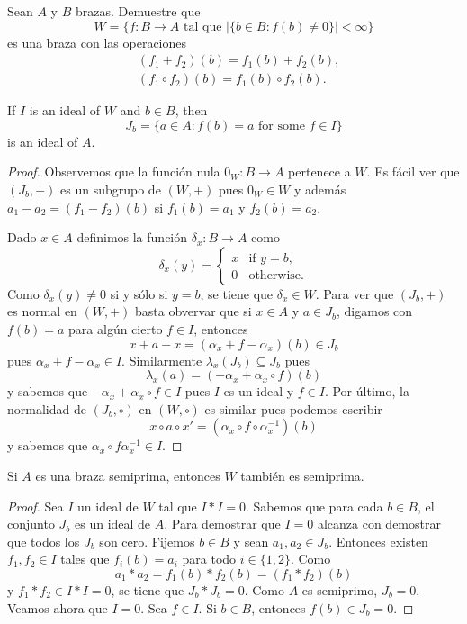 \begin{lemma}
    Sean $A$ y $B$ brazas. Demuestre que
    \[
    W=\{f\colon B\to A\text{ tal que $|\{b\in B:f(b)\ne 0\}|<\infty$}\}
    \]
    es una braza con las operaciones
    \begin{align*}
        &(f_1+f_2)(b)=f_1(b)+f_2(b),
        \\
        &(f_1\circ f_2)(b)=f_1(b)\circ f_2(b).
    \end{align*}
\end{lemma}

\begin{lemma}
    If $I$ is an ideal of $W$ and $b\in B$, then
    \[
    J_b=\{a\in A:f(b)=a\text{ for some $f\in I$}\}
    \]
    is an ideal of $A$.
\end{lemma}

\begin{proof}
    Observemos que la función nula $0_W\colon B\to A$ pertenece a $W$. Es fácil
    ver que $(J_b,+)$ es un subgrupo de $(W,+)$ pues $0_W\in W$ y además
    $a_1-a_2=(f_1-f_2)(b)$ si $f_1(b)=a_1$ y $f_2(b)=a_2$. 
    
    Dado $x\in A$ definimos la función $\delta_x\colon B\to A$ como
    \[
    \delta_x(y)=\begin{cases}
    x & \text{if $y=b$},\\
    0 & \text{otherwise}.
    \end{cases}
    \]
    Como $\delta_x(y)\ne 0$ si y sólo si $y=b$, se tiene que $\delta_x\in W$. Para ver
    que $(J_b,+)$ es normal en $(W,+)$ basta obvervar que si $x\in A$ y $a\in J_b$, digamos
    con $f(b)=a$ para algún cierto $f\in I$, entonces 
    \[
    x+a-x=(\alpha_x+f-\alpha_x)(b)\in J_b
    \]
    pues $\alpha_x+f-\alpha_x\in I$. Similarmente $\lambda_x(J_b)\subseteq J_b$ pues
    \[
    \lambda_x(a)=(-\alpha_x+\alpha_x\circ f)(b)
    \]
    y sabemos que $-\alpha_x+\alpha_x\circ f\in I$ pues $I$ es un ideal y $f\in I$. Por último,
    la normalidad de $(J_b,\circ)$ en $(W,\circ)$ es similar pues podemos escribir
    \[
    x\circ a\circ x'=(\alpha_x\circ f\circ\alpha_x^{-1})(b)
    \]
    y sabemos que $\alpha_x\circ f\alpha_x^{-1}\in I$.
\end{proof}

\begin{proposition}
Si $A$ es una braza semiprima, entonces $W$ también es semiprima.
\end{proposition}

\begin{proof}
Sea $I$ un ideal de $W$ tal que $I*I=0$. Sabemos que para cada $b\in B$, 
el conjunto $J_b$ es un ideal de $A$. Para demostrar que $I=0$ alcanza con 
demostrar que todos los $J_b$ son cero. Fijemos $b\in B$
y sean $a_1,a_2\in J_b$. Entonces existen $f_1,f_2\in I$ tales que $f_i(b)=a_i$
para todo $i\in\{1,2\}$. Como
\[
a_1*a_2=f_1(b)*f_2(b)=(f_1*f_2)(b)
\]
y $f_1*f_2\in I*I=0$, se tiene que $J_b*J_b=0$. Como $A$ es semiprimo, $J_b=0$. 
Veamos ahora que $I=0$. Sea $f\in I$. Si $b\in B$, entonces $f(b)\in J_b=0$. 
\end{proof}

